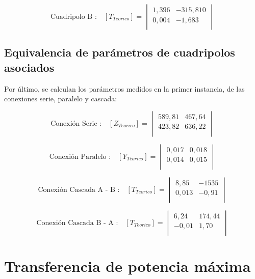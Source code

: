 \documentclass[a4paper]{article}
\begin{document}
\begin{equation}
\text{Cuadripolo B :}\quad [T_{Teorico}] =
\begin{vmatrix}
	1,396 & -315,810\\
	0,004 & -1,683\\
\end{vmatrix}
\end{equation}

\subsection*{Equivalencia de parámetros de cuadripolos asociados}

Por último, se calculan los parámetros medidos en la primer instancia, de las conexiones serie, paralelo y cascada:

\begin{equation}
\text{Conexión Serie :}\quad [Z_{Teorico}] =
\begin{vmatrix}
	589,81 & 467,64\\
	423,82 & 636,22\\
\end{vmatrix}
\end{equation}

\begin{equation}
\text{Conexión Paralelo :}\quad [Y_{Teorico}] =
\begin{vmatrix}
	0,017 & 0,018\\
	0,014 & 0,015\\
\end{vmatrix}
\end{equation}

\begin{equation}
\text{Conexión Cascada A - B :}\quad [T_{Teorico}] =
\begin{vmatrix}
	8,85 & -1535\\
	0,013 & -0,91\\
\end{vmatrix}
\end{equation}

\begin{equation}
\text{Conexión Cascada B - A :}\quad [T_{Teorico}] =
\begin{vmatrix}
	6,24 & 174,44\\
	-0,01 & 1,70\\
\end{vmatrix}
\end{equation}

\section*{Transferencia de potencia máxima}
\end{document}
